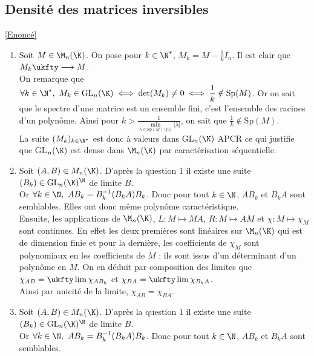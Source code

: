 \documentclass{book}
\begin{document}
	\subsection{Densité des matrices inversibles }
	\label{sec:densite-des-matrices-inversibles-etoile3}
	\textcolor{blue}{\hyperref[Densité des matrices inversibles]{[Enoncé]}}\\
	\begin{enumerate}[leftmargin=*]
		\item Soit $M\in \M_n(\K)$. On pose pour $k\in \N^*$, $M_k=M-\displaystyle\frac{1}{k}I_n$. Il est clair que $M_k\ukfty\longrightarrow M$.\\
		On remarque que $\forall k\in \N^*,\ M_k\in \text{GL}_n(\K)\iff \det(M_k)\ne 0\iff \displaystyle\frac{1}{k}\notin\text{Sp}(M)$. Or on sait que le spectre d'une matrice est un ensemble fini, c'est l'ensemble des racines d'un polynôme. Ainsi pour $k> \displaystyle\frac{1}{\min\limits_{\lambda\in \text{Sp}(M)\setminus\{0\}}|\lambda|}$, on sait que $\displaystyle\frac{1}{k}\notin \text{Sp}(M)$.\\
		La suite $(M_k)_{k\in \N^*}$ est donc à valeurs dans GL$_n(\K)$ APCR ce qui justifie que GL$_n(\K)$ est dense dans $\M_n(\K)$ par caractérisation séquentielle.
		\item Soit $(A,B)\in M_n(\K)$. D'après la question $1$ il existe une suite $(B_k)\in \text{GL}_n(\K)^\N$ de limite $B$.\\
		Or $\forall k\in \N,\ AB_k=B_k^{-1}(B_kA)B_k$. Donc pour tout $k\in \N$, $AB_k$ et $B_kA$ sont semblables. Elles ont donc même polynôme caractéristique.\\
		Ensuite, les applications de $\M_n(\K)$, $L:M\mapsto MA$, $R:M\mapsto AM$ et $\chi:M\mapsto \chi_M$ sont continues. En effet les deux premières sont linéaires sur $\M_n(\K)$ qui est de dimension finie et pour la dernière, les coefficients de $\chi_M$ sont polynomiaux en les coefficients de $M$ : ils sont issus d'un déterminant d'un polynôme en $M$. On en déduit par composition des limites que $\chi_{AB}=\ukfty\lim\chi_{AB_k}$ et $\chi_{BA}=\ukfty\lim\chi_{B_kA}$.\\
		Ainsi par unicité de la limite, $\chi_{AB}=\chi_{BA}$.
		\item Soit $(A,B)\in M_n(\K)$. D'après la question $1$ il existe une suite $(B_k)\in \text{GL}_n(\K)^\N$ de limite $B$.\\
		Or $\forall k\in \N,\ AB_k=B_k^{-1}(B_kA)B_k$. Donc pour tout $k\in \N$, $AB_k$ et $B_kA$ sont semblables.\\

\end{enumerate}
\end{document}
